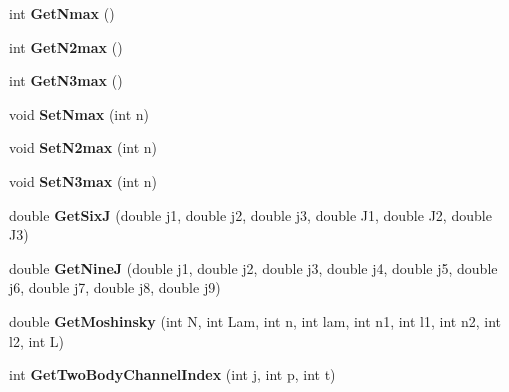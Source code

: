 \begin{DoxyCompactItemize}
\item 
\hypertarget{classModelSpace_aa17b852a2902e4ec22a5c87f53de2dea}{int {\bfseries Get\-Nmax} ()}\label{classModelSpace_aa17b852a2902e4ec22a5c87f53de2dea}

\item 
\hypertarget{classModelSpace_a415e7663769bcab236a66c9914f9ff13}{int {\bfseries Get\-N2max} ()}\label{classModelSpace_a415e7663769bcab236a66c9914f9ff13}

\item 
\hypertarget{classModelSpace_a15a5f8ef44f769c052ae1ae5d475fc01}{int {\bfseries Get\-N3max} ()}\label{classModelSpace_a15a5f8ef44f769c052ae1ae5d475fc01}

\item 
\hypertarget{classModelSpace_a1a50d734edaef5cb3bd79a4707ef1e82}{void {\bfseries Set\-Nmax} (int n)}\label{classModelSpace_a1a50d734edaef5cb3bd79a4707ef1e82}

\item 
\hypertarget{classModelSpace_ab13111671fc76cf1c52b98a3f78a1dcd}{void {\bfseries Set\-N2max} (int n)}\label{classModelSpace_ab13111671fc76cf1c52b98a3f78a1dcd}

\item 
\hypertarget{classModelSpace_a432f3913aa487bf7fc7c4eb5a2197599}{void {\bfseries Set\-N3max} (int n)}\label{classModelSpace_a432f3913aa487bf7fc7c4eb5a2197599}

\item 
\hypertarget{classModelSpace_a716c2bf4a6b42c1c27579b0b7804252e}{double {\bfseries Get\-Six\-J} (double j1, double j2, double j3, double J1, double J2, double J3)}\label{classModelSpace_a716c2bf4a6b42c1c27579b0b7804252e}

\item 
\hypertarget{classModelSpace_ab9303a5a0cc4513bf4ed4430d9fe86a6}{double {\bfseries Get\-Nine\-J} (double j1, double j2, double j3, double j4, double j5, double j6, double j7, double j8, double j9)}\label{classModelSpace_ab9303a5a0cc4513bf4ed4430d9fe86a6}

\item 
\hypertarget{classModelSpace_a85f0b95b2cd46504702ea80489455beb}{double {\bfseries Get\-Moshinsky} (int N, int Lam, int n, int lam, int n1, int l1, int n2, int l2, int L)}\label{classModelSpace_a85f0b95b2cd46504702ea80489455beb}

\item 
\hypertarget{classModelSpace_ae73e211248e6f2bd4cc1bb0f030144ce}{int {\bfseries Get\-Two\-Body\-Channel\-Index} (int j, int p, int t)}\label{classModelSpace_ae73e211248e6f2bd4cc1bb0f030144ce}


\end{DoxyCompactItemize}
